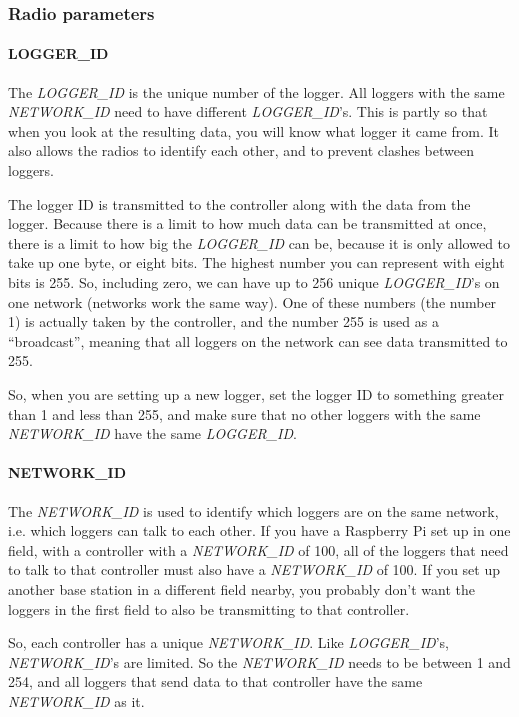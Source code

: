 \documentclass[10pt]{article}
\begin{document}
\subsubsection{Radio parameters}

\paragraph{LOGGER\_ID}
The \textit{LOGGER\_ID} is the unique number of the logger. All loggers with the same \textit{NETWORK\_ID} need to have different \textit{LOGGER\_ID}'s. This is partly so 
that when you look at the resulting data, you will know what logger it came from. It also allows the radios to identify each other, and to prevent clashes between 
loggers. 

The logger ID is transmitted to the controller along with the data from the logger. Because there is a limit to how much data can be transmitted at once, there is a limit
to how big the \textit{LOGGER\_ID} can be, because it is only allowed to take up one byte, or eight bits. The highest number you can represent with eight bits is 255. So,
including zero, we can have up to 256 unique \textit{LOGGER\_ID}'s on one network (networks work the same way). One of these numbers (the number 1) is actually taken by
the controller, and the number 255 is used as a ``broadcast'', meaning that all loggers on the network can see data transmitted to 255.

So, when you are setting up a new logger, set the logger ID to something greater than 1 and less than 255, and make sure that no other loggers with the same 
\textit{NETWORK\_ID} have the same \textit{LOGGER\_ID}. 

\paragraph{NETWORK\_ID}
The \textit{NETWORK\_ID} is used to identify which loggers are on the same network, i.e. which loggers can talk to each other. If you have a Raspberry Pi set up in one
field, with a controller with a \textit{NETWORK\_ID} of 100, all of the loggers that need to talk to that controller must also have a \textit{NETWORK\_ID} of 100. If you 
set up another base station in a different field nearby, you probably don't want the loggers in the first field to also be transmitting to that controller.

So, each controller has a unique \textit{NETWORK\_ID}. Like \textit{LOGGER\_ID}'s, \textit{NETWORK\_ID}'s are limited. So the \textit{NETWORK\_ID} needs to be between 1 and 254, and all loggers that send data to that controller have the same \textit{NETWORK\_ID} as it.
\end{document}
